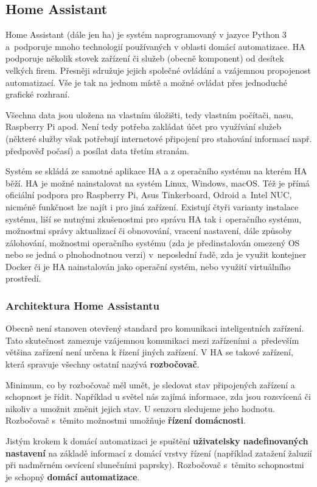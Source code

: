 \subsection{Home Assistant}
Home Assistant (dále jen \acrshort{ha}) je systém naprogramovaný v jazyce Python 3 a~podporuje mnoho technologií používaných v oblasti domácí automatizace. HA podporuje několik stovek zařízení či služeb (obecně komponent) od desítek velkých firem. Přesněji sdružuje jejich společné ovládání a vzájemnou propojenost automatizací. Vše je tak na jednom místě a možné ovládat přes jednoduché grafické rozhraní.

Všechna data jsou uložena na vlastním úložišti, tedy vlastním počítači, nasu, Raspberry Pi apod. Není tedy potřeba zakládat účet pro využívání služeb (některé služby však potřebují internetové připojení pro stahování informací např. předpověď počasí) a posílat data třetím stranám.

Systém se skládá ze samotné aplikace HA a z operačního systému na kterém HA běží. HA je možné nainstalovat na systém Linux, Windows, macOS. Též je přímá oficiální podpora pro Raspberry Pi, Asus Tinkerboard, Odroid a~Intel NUC, nicméně funkčnost lze najít i pro jiná zařízení. Existují čtyři varianty instalace systému, liší se nutnými zkušenostmi pro správu HA tak i~operačního systému, možnostmi správy aktualizací či obnovování, vracení nastavení, dále způsoby zálohování, možnostmi operačního systému (zda je předinstalován omezený OS nebo se jedná o plnohodnotnou verzi) v~neposlední řadě, zda je využit kontejner Docker či je HA nainstalován jako operační systém, nebo využití virtuálního prostředí.

\subsubsection{Architektura Home Assistantu}
Obecně není stanoven otevřený standard pro komunikaci inteligentních zařízení. Tato skutečnost zamezuje vzájemnou komunikaci mezi zařízeními a~především většina zařízení není určena k řízení jiných zařízení. V HA se takové zařízení, která spravuje všechny ostatní nazývá \textbf{rozbočovač}.

Minimum, co by rozbočovač měl umět, je sledovat stav připojených zařízení a schopnost je řídit. Například u světel nás zajímá informace, zda jsou rozsvícená či nikoliv a umožnit změnit jejich stav. U senzoru sledujeme jeho hodnotu. Rozbočovač s~těmito možnostmi umožňuje \textbf{řízení domácnosti}.

Jistým krokem k domácí automatizaci je spuštění \textbf{uživatelsky nadefinovaných nastavení} na základě informací z domácí vrstvy řízení (například zatažení žaluzií při nadměrném osvícení slunečními paprsky). Rozbočovač s~těmito schopnostmi je schopný \textbf{domácí automatizace}.

